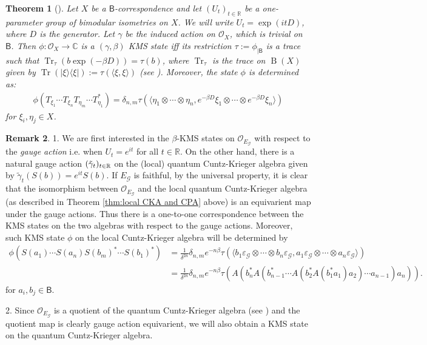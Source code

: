 \documentclass[a4paper,reqno]{amsart}
\numberwithin{equation}{section}
\newtheorem{theorem}{Theorem}
\numberwithin{theorem}{section}
\theoremstyle{definition}\newtheorem{definition}[theorem]{Definition}
\theoremstyle{definition}\newtheorem{remark}[theorem]{Remark}
\theoremstyle{definition}\newtheorem{example}[theorem]{Example}
\theoremstyle{definition}\newtheorem*{notation*}{Notation}
\theoremstyle{definition}\newtheorem*{convention*}{Convention}
\theoremstyle{definition}\newtheorem{observation}{Observation}
\theoremstyle{definition}\newtheorem*{acknowledgment*}{Acknowledgments}
\newcommand{\R}{\mathbb{R}}
\newcommand{\B}{\mathsf{B}}
\newcommand{\G}{\mathcal{G}}
\renewcommand{\op}[1]{\operatorname{#1}}
\begin{document}
\begin{theorem}[{\cite[Theorems 2.1, 2.5]{LN}}]\label{Thm:LN}
Let $X$ be a $\B$-correspondence and let $(U_t)_{t\in\R}$ be a one-parameter group of bimodular isometries on $X$. We will write $U_{t} = \exp(itD)$, where $D$ is the generator. Let $\gamma$ be the induced action on $\mathcal{O}_X$, which is trivial on $\B$. Then $\phi: \mathcal{O}_{X} \to \mathbb{C}$ is a $(\gamma,\beta)$ KMS state iff its restriction $\tau:=\phi_{|\B}$ is a trace such that $\op{Tr}_{\tau}(b \exp(-\beta D)) = \tau(b)$, where $\op{Tr}_{\tau}$ is the trace on $\op{B}(X)$ given by $\op{Tr}(|\xi\rangle\langle \xi|):= \tau(\langle \xi, \xi\rangle)$ (see \cite[Theorem 1.1.]{LN}). Moreover, the state $\phi$ is determined as:
\begin{align*}
    \phi(T_{\xi_1}\cdots T_{\xi_n}T_{\eta_m}\cdots T_{\eta_1}^*)=\delta_{n,m}\tau(\langle\eta_1\otimes\cdots\otimes\eta_n, e^{-\beta D}\xi_1\otimes\cdots \otimes e^{-\beta D}\xi_n\rangle)
\end{align*}
for $\xi_i,\eta_j\in X$.
\end{theorem}

\begin{remark}
1.
 We are first interested in the $\beta$-KMS states on $\mathcal{O}_{E_\G}$ with respect to the {\em gauge action
 } i.e. when $U_t=e^{it}$ for all $t\in \R$. On the other hand, there is a natural  gauge action  $(\Tilde{\gamma}_t)_{t\in \R}$  on the (local) quantum Cuntz-Krieger algebra given by $\tilde{\gamma}_t(S(b))=e^{it}S(b)$. If $E_\G$ is faithful, by the universal property, it is clear that the isomorphism between $\mathcal{O}_{E_\G}$ and the local quantum Cuntz-Krieger algebra (as described in Theorem \ref{thm:local CKA and CPA} above) is an equivarient map under the gauge actions. Thus there is a one-to-one correspondence between the KMS states  on the two algebras with respect to the gauge actions. Moreover, such KMS state $\phi$ on the local Cuntz-Krieger algebra will be determined by 
 \begin{align*}
    \phi(S(a_1)\cdots S(a_n)S(b_m)^*\cdots S(b_1)^*)&= \frac{1}{\delta^{2n}}\delta_{n,m} e^{-n\beta}\tau(\langle b_1\varepsilon_\G\otimes\cdots \otimes b_n\varepsilon_\G, a_1\varepsilon_\G\otimes\cdots \otimes a_n\varepsilon_\G\rangle)\\
   &=\frac{1}{\delta^{2n}}\delta_{n,m} e^{-n\beta}\tau(A(b_n^*A(b_{n-1}^*\cdots A(b_2^*A(b_1^*a_1)a_2)\cdots a_{n-1})a_n)).
 \end{align*}
 for $a_i, b_j\in \B$.
 
 2. Since $\mathcal{O}_{E_\G}$ is a quotient of the quantum Cuntz-Krieger algebra (see \cite[Corollary 3.7]{BHINW}) and the quotient map is clearly gauge action equivarient, we will also obtain a KMS state on the quantum Cuntz-Krieger algebra.
\end{remark}
\end{document}
